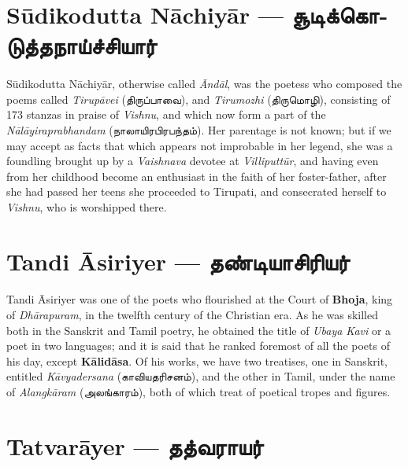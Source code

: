 \documentclass{article}
\newcommand{\TamilText}[1]{\texttamil{#1}}
\newcommand{\TamilBold}[1]{\texttamil{\textbf{#1}}}
\newcommand{\tam}[1]{\TamilText{#1}}
\newcommand{\tambold}[1]{\TamilBold{#1}}
\begin{document}
\section{S\={u}dikodutta N\={a}chiy\={a}r --- \tambold{சூடிக்கொடுத்தநாய்ச்சியார்}}
\paragraph{}
S\={u}dikodutta N\={a}chiy\={a}r, otherwise called \emph{\={A}nd\={a}l}, was the poetess who composed the poems called \emph{Tirup\={a}vei} (\tam{திருப்பாவை}), and \emph{Tirumozhi} (\tam{திருமொழி}), consisting of 173 stanzas in praise of \emph{Vishnu}, and which now form a part of the \emph{N\={a}l\={a}yiraprabhandam} (\tam{நாலாயிரபிரபந்தம்}). Her parentage is not known; but if we may accept as facts that which appears not improbable in her legend, she was a foundling brought up by a \emph{Vaishnava} devotee at \emph{Villiputt\={u}r}, and having even from her childhood become an enthusiast in the faith of her foster-father, after she had passed her teens she proceeded to Tirupati, and consecrated herself to \emph{Vishnu}, who is worshipped there.

\section{Tandi \={A}siriyer --- \tambold{தண்டியாசிரியர்}}
\paragraph{}
Tandi \={A}siriyer was one of the poets who flourished at the Court of \textbf{Bhoja}, king of \emph{Dh\={a}rapuram}, in the twelfth century of the Christian era. As he was skilled both in the Sanskrit and Tamil poetry, he obtained the title of \emph{Ubaya Kavi} or a poet in two languages; and it is said that he ranked foremost of all the poets of his day, except \textbf{K\={a}lid\={a}sa}. Of his works, we have two treatises, one in Sanskrit, entitled \emph{K\={a}vyadersana} (\tam{காவியதரிசனம்}), and the other in Tamil, under the name of \emph{Alangk\={a}ram} (\tam{அலங்காரம்}), both of which treat of poetical tropes and figures.

\section{Tatvar\={a}yer --- \tambold{தத்வராயர்}}
\end{document}
